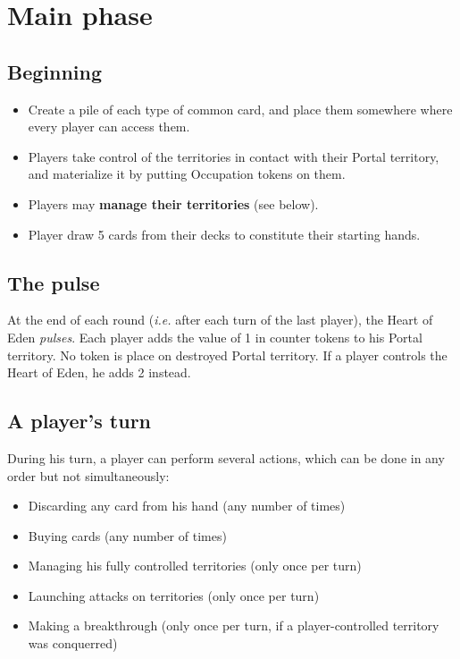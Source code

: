 \documentclass[a4paper]{article}
\begin{document}
\newpage
\section{Main phase}

  \subsection{Beginning}
  
  	\begin{itemize}
        \item Create a pile of each type of common card,
            and place them somewhere where every player can access them.
        \item Players take control of the territories in contact with their Portal
        territory, and materialize it by putting Occupation tokens on them.
        \item Players may \textbf{manage their territories} (see below).
        \item Player draw 5 cards from their decks to constitute their starting hands.
    \end{itemize}
    
  \subsection{The pulse}
  
  	At the end of each round (\textit{i.e.} after each turn of the last player),
  	the Heart of Eden \textit{pulses}.
  	Each player adds the value of 1 in counter tokens to his Portal territory.
  	No token is place on destroyed Portal territory.
  	If a player controls the Heart of Eden, he adds 2 instead.


  \subsection{A player's turn}

    \hspace{-2em} During his turn, a player can perform several actions,
    which can be done in any order but not simultaneously:
    \vspace{-1.3em}
    \begin{itemize}
        \item Discarding any card from his hand (any number of times)
        \item Buying cards (any number of times)
        \item Managing his fully controlled territories (only once per turn)
        \item Launching attacks on territories (only once per turn)
        \item Making a breakthrough (only once per turn,
        if a player-controlled territory was conquerred)
    \end{itemize}
    
\end{document}
